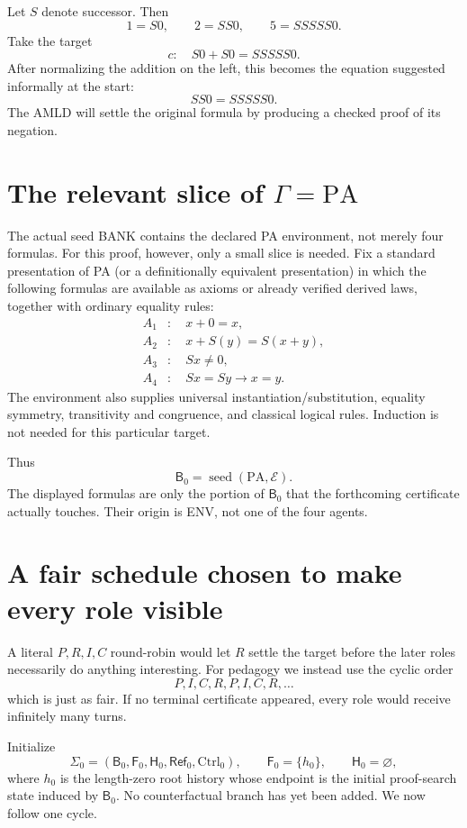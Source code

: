 \documentclass[11pt,openany]{book}
\theoremstyle{definition}
\theoremstyle{remark}
\newcommand{\Bank}{\mathsf{B}}
\newcommand{\Future}{\mathsf{F}}
\newcommand{\Hist}{\mathsf{H}}
\newcommand{\State}{\Sigma}
\newcommand{\Env}{\mathcal{E}}
\newcommand{\Refl}{\mathsf{Ref}}
\begin{document}
Let $S$ denote successor. Then
\[
1=S0,\qquad 2=SS0,\qquad 5=SSSSS0.
\]
Take the target
\[
c:\quad S0+S0=SSSSS0.
\]
After normalizing the addition on the left, this becomes the equation suggested informally at the start:
\[
SS0=SSSSS0.
\]
The AMLD will settle the original formula by producing a checked proof of its negation.

\section{The relevant slice of \texorpdfstring{$\Gamma=\mathrm{PA}$}{Gamma = PA}}
The actual seed BANK contains the declared PA environment, not merely four formulas. For this proof, however, only a small slice is needed. Fix a standard presentation of PA (or a definitionally equivalent presentation) in which the following formulas are available as axioms or already verified derived laws, together with ordinary equality rules:
\begin{align*}
A_1&:\quad x+0=x,\\
A_2&:\quad x+S(y)=S(x+y),\\
A_3&:\quad Sx\neq0,\\
A_4&:\quad Sx=Sy\rightarrow x=y.
\end{align*}
The environment also supplies universal instantiation/substitution, equality symmetry, transitivity and congruence, and classical logical rules. Induction is not needed for this particular target.

Thus
\[
\Bank_0=\operatorname{seed}(\mathrm{PA},\Env).
\]
The displayed formulas are only the portion of $\Bank_0$ that the forthcoming certificate actually touches. Their origin is \textsf{ENV}, not one of the four agents.

\section{A fair schedule chosen to make every role visible}
A literal $P,R,I,C$ round-robin would let $R$ settle the target before the later roles necessarily do anything interesting. For pedagogy we instead use the cyclic order
\[
P,I,C,R,P,I,C,R,\ldots
\]
which is just as fair. If no terminal certificate appeared, every role would receive infinitely many turns.

Initialize
\[
\State_0=(\Bank_0,\Future_0,\Hist_0,\Refl_0,\mathrm{Ctrl}_0),
\qquad
\Future_0=\{h_0\},
\qquad
\Hist_0=\varnothing,
\]
where $h_0$ is the length-zero root history whose endpoint is the initial proof-search state induced by $\Bank_0$. No counterfactual branch has yet been added. We now follow one cycle.
\end{document}
